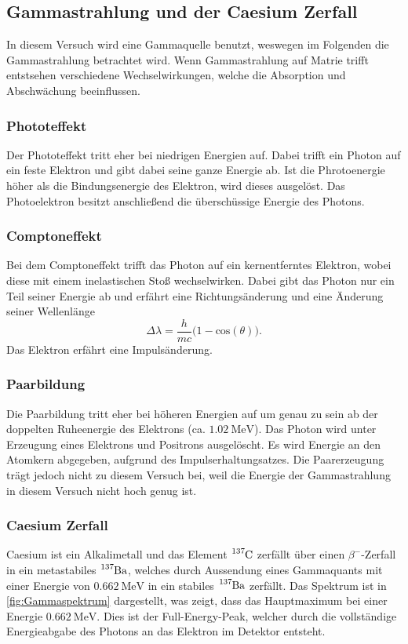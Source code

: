 \subsection{Gammastrahlung und der Caesium Zerfall}
\label{subsec:GammaCaesium}
In diesem Versuch wird eine Gammaquelle benutzt, weswegen im Folgenden die Gammastrahlung betrachtet wird. Wenn Gammastrahlung auf Matrie trifft entstsehen verschiedene Wechselwirkungen,
welche die Absorption und Abschwächung beeinflussen. 

\subsubsection{Phototeffekt}
\label{subsubsec:Phototeffekt}
Der Phototeffekt tritt eher bei niedrigen Energien auf. Dabei trifft ein Photon auf ein feste Elektron und gibt dabei seine ganze Energie ab. Ist die Phrotoenergie höher als die Bindungsenergie
des Elektron, wird dieses ausgelöst. Das Photoelektron besitzt anschließend die überschüssige Energie des Photons.

\subsubsection{Comptoneffekt}
\label{subsubsec:Comptoneffekt}
Bei dem Comptoneffekt trifft das Photon auf ein kernentferntes Elektron, wobei diese mit einem inelastischen Stoß wechselwirken.
Dabei gibt das Photon nur ein Teil seiner Energie ab und erfährt eine Richtungsänderung und eine Änderung seiner Wellenlänge
\begin{equation}
    \Delta \lambda = \frac{h}{m c} \biggl(1 - \text{cos}(\theta)\biggr).
\end{equation}
Das Elektron erfährt eine Impulsänderung.

\subsubsection{Paarbildung}
\label{subsubsec:Paarbildung}
Die Paarbildung tritt eher bei höheren Energien auf um genau zu sein ab der doppelten Ruheenergie des Elektrons (ca. $\qty{1.02}{\mega\eV}$). Das Photon wird unter Erzeugung eines 
Elektrons und Positrons ausgelöscht. Es wird Energie an den Atomkern abgegeben, aufgrund des Impulserhaltungsatzes. Die Paarerzeugung trägt jedoch nicht zu diesem Versuch bei, weil die 
Energie der Gammastrahlung in diesem Versuch nicht hoch genug ist.

\subsubsection{Caesium Zerfall}
\label{subsubsec:Caesium}
Caesium ist ein Alkalimetall und das Element $\ce{^{137}C}$ zerfällt über einen $\beta^-$-Zerfall in ein metastabiles $\ce{^{137}Ba}$, welches durch Aussendung eines Gammaquants mit einer 
Energie von $\qty{0.662}{\mega\eV}$ in ein stabiles $\ce{^{137}Ba}$ zerfällt. Das Spektrum ist in \autoref{fig:Gammaspektrum} dargestellt, was zeigt, dass das Hauptmaximum bei einer Energie
$\qty{0.662}{\mega\eV}$. Dies ist der Full-Energy-Peak, welcher durch die vollständige Energieabgabe des Photons an das Elektron im Detektor entsteht.

